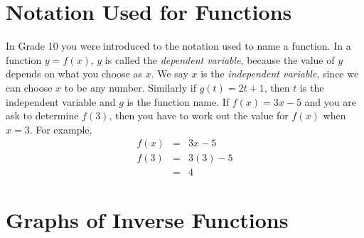 \section{Notation Used for Functions}
In Grade 10 you were introduced to the notation used to name a function.  In a function $y=f(x)$, $y$ is called the \textit{dependent variable}, because the value of $y$ depends on what you choose as $x$. We say $x$ is the \textit{independent variable}, since we can choose $x$ to be any number. Similarly if $g(t) = 2t + 1$, then $t$ is the independent variable and $g$ is the function name.
If $f(x) = 3x-5$ and you are ask to determine $f(3)$, then you have to work out the value for $f(x)$ when $x = 3$.
For example,
\begin{eqnarray*}
f(x) &=& 3x-5\\
f(3) &=& 3(3)-5\\
&=&4
\end{eqnarray*}

\section{Graphs of Inverse Functions}
\label{mf:inverses}


